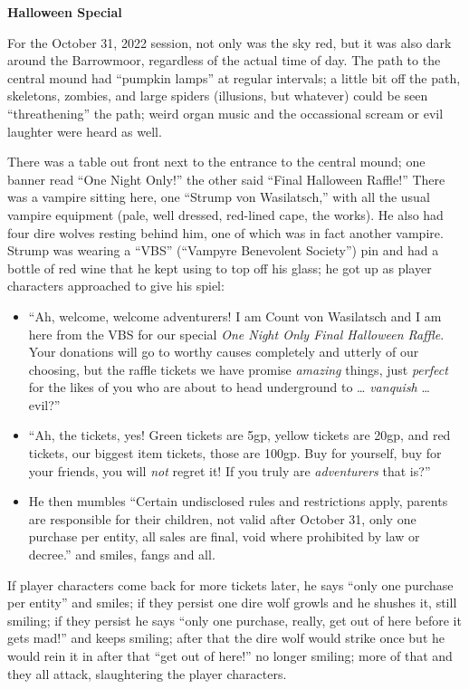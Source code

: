 \textbf{Halloween Special}

For the October 31, 2022 session, not only was the sky red, but it was also
dark around the Barrowmoor, regardless of the actual time of day. The path to
the central mound had ``pumpkin lamps'' at regular intervals; a little bit off
the path, skeletons, zombies, and large spiders (illusions, but whatever) could
be seen ``threathening'' the path; weird organ music and the occassional scream
or evil laughter were heard as well.

There was a table out front next to the entrance to the central mound; one banner
read ``One Night Only!'' the other said ``Final Halloween Raffle!'' There was a
vampire sitting here, one ``Strump von Wasilatsch,'' with all the usual vampire
equipment (pale, well dressed, red-lined cape, the works). He also had four dire
wolves resting behind him, one of which was in fact another vampire. Strump was
wearing a ``VBS'' (``Vampyre Benevolent Society'') pin and had a bottle of red
wine that he kept using to top off his glass; he got up as player characters
approached to give his spiel:

\begin{itemize}

\item ``Ah, welcome, welcome adventurers! I am Count von Wasilatsch and I am
  here from the VBS for our special \emph{One Night Only Final Halloween Raffle}.
  Your donations will go to worthy causes completely and utterly of our choosing,
  but the raffle tickets we have promise \emph{amazing} things, just \emph{perfect}
  for the likes of you who are about to head underground to \dots{} \emph{vanquish}
  \dots{} evil?''

\item ``Ah, the tickets, yes! Green tickets are 5gp, yellow tickets are 20gp,
  and red tickets, our biggest item tickets, those are 100gp. Buy for yourself,
  buy for your friends, you will \emph{not} regret it! If you truly are
  \emph{adventurers} that is?''

\item He then mumbles ``Certain undisclosed rules and restrictions apply,
  parents are responsible for their children, not valid after October 31, only
  one purchase per entity, all sales are final, void where prohibited by law or
  decree.'' and smiles, fangs and all.

\end{itemize}

If player characters come back for more tickets later, he says ``only one
purchase per entity'' and smiles; if they persist one dire wolf growls and he
shushes it, still smiling; if they persist he says ``only one purchase, really,
get out of here before it gets mad!'' and keeps smiling; after that the dire
wolf would strike once but he would rein it in after that ``get out of here!''
no longer smiling; more of that and they all attack, slaughtering the player
characters.

